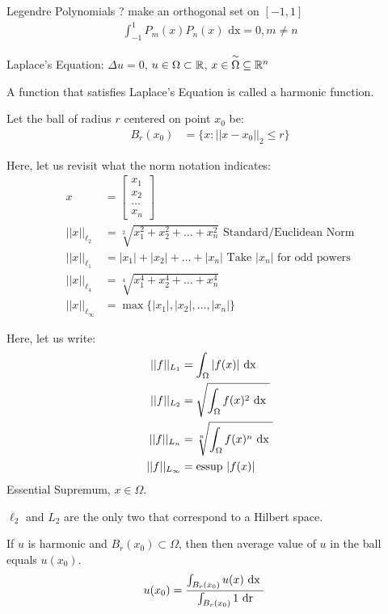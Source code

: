 Legendre Polynomials ? make an orthogonal set on $[-1, 1]$
%
\begin{align}
  \int^1_{-1} P_m(x) P_n(x) \text{ dx} = 0, m \neq n
\end{align}

Laplace's Equation: $\Delta u = 0$, $u \in \Omega \subset \mathbb R$, $x \in \overset{\sim}{\Omega} \subseteq \mathbb R^n$

\dfn A function that satisfies Laplace's Equation is called a harmonic function.

\dfn Let the ball of radius $r$ centered on point $x_0$ be:
%
\begin{align}
  B_r(x_0) & = \{x : ||x - x_0||_2 \leq r \}
\end{align}

Here, let us revisit what the norm notation indicates:
%
\begin{align}
  x & =
  \begin{bmatrix}
    x_1\\
    x_2\\
    \ldots\\
    x_n
  \end{bmatrix}\\
  ||x||_{\ell_2} & = \sqrt[2]{x^2_1 + x^2_2 + \ldots + x^2_n} \text{ Standard/Euclidean Norm}\\
  ||x||_{\ell_1} & = |x_1| + |x_2| + \ldots + |x_n| \text{ Take $|x_n|$ for odd powers}\\
  ||x||_{\ell_4} & = \sqrt[4]{x^4_1 + x^4_2 + \ldots + x^4_n}\\
  ||x||_{\ell_\infty} & = \max\{ |x_1|, |x_2|, \ldots, |x_n| \}
\end{align}

Here, let us write:
%
\begin{align}
  ||f||_{L_1} & = \int_\Omega |f(x)| \text{ dx }\\
  ||f||_{L_2} & = \sqrt{\int_\Omega f(x)^2 \text{ dx }}\\
  ||f||_{L_n} & = \sqrt[n]{\int_\Omega f(x)^n \text{ dx }}\\
  ||f||_{L_\infty} & = \text{essup } |f(x)|
\end{align}
Essential Supremum, $x \in \Omega$.

$\ell_2$ and $L_2$ are the only two that correspond to a Hilbert space.

\thm If $u$ is harmonic and $B_r(x_0) \subset \Omega$, then then average value of $u$ in the ball equals $u(x_0)$.
%
\begin{align}
  u(x_0) & = \frac
  {
    \int_{B_r(x_0)} u(x) \text{ dx }
  }
  {
    \int_{B_r(x_0)} 1 \text{ dr}
  }
\end{align}

